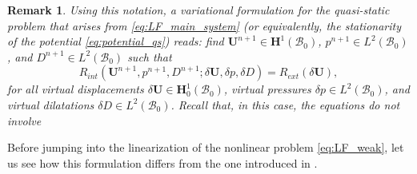 \documentclass{sfuthesis}
\numberwithin{equation}{section}
\numberwithin{figure}{chapter}
\numberwithin{table}{chapter}
\newtheorem{remark}[theorem]{Remark}
\theoremstyle{definition}
\def\*#1{{\mathbf{#1}}} %
\newcommand{\B}{\mathcal{B}}
\begin{document}
\begin{remark}
    Using this notation, a variational formulation for the quasi-static problem that arises from \eqref{eq:LF_main_system} (or equivalently, the stationarity of the potential \eqref{eq:potential_qs}) reads: find $\*U^{n+1} \in \*H^1(\B_0)$, $p^{n+1} \in L^2(\B_0)$, and $D^{n+1} \in L^2(\B_0)$ such that
    \begin{equation}
        R_{int}(\*U^{n+1}, p^{n+1}, D^{n+1} ; \delta\*U, \delta p, \delta D) = R_{ext}(\delta \*U),
    \end{equation} 
    for all virtual displacements $\delta\*U \in \*H_0^1(\B_0)$, virtual pressures $\delta p \in L^2(\B_0)$, and virtual dilatations $\delta D \in L^2(\B_0)$. Recall that, in this case, the equations do not involve
\end{remark}

Before jumping into the linearization of the nonlinear problem \eqref{eq:LF_weak}, let us see how this formulation differs from the one introduced in \cite{Seba}.
\end{document}
